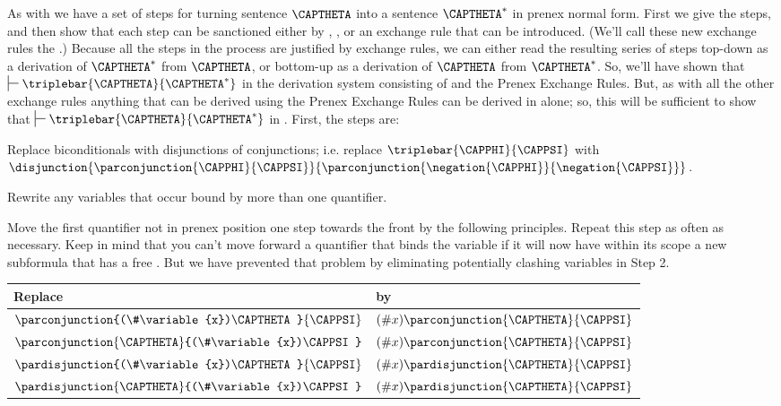 \begin{PROOF}
As with  we have a set of steps for turning sentence $\CAPTHETA$ into a sentence $\CAPTHETA^*$ in prenex normal form. 
First we give the steps, and then show that each step can be sanctioned either by , , or an exchange rule that can be introduced.
(We'll call these new exchange rules the .) 
Because all the steps in the process are justified by exchange rules, we can either read the resulting series of steps top-down as a derivation of $\CAPTHETA^*$ from $\CAPTHETA$, or bottom-up as a derivation of $\CAPTHETA$ from $\CAPTHETA^*$. 
So, we'll have shown that $\sststile{}{}\triplebar{\CAPTHETA}{\CAPTHETA^*}$ in the derivation system consisting of  and the Prenex Exchange Rules.
But, as with all the other exchange rules anything that can be derived using the Prenex Exchange Rules can be derived in \GQD{} alone;
so, this will be sufficient to show that $\sststile{}{}\triplebar{\CAPTHETA}{\CAPTHETA^*}$ in \GQD{}. First, the steps are:
\begin{cenumerate}
\item Replace biconditionals with disjunctions of conjunctions; i.e. replace $\triplebar{\CAPPHI}{\CAPPSI}$ with $\disjunction{\parconjunction{\CAPPHI}{\CAPPSI}}{\parconjunction{\negation{\CAPPHI}}{\negation{\CAPPSI}}}$.
\item Rewrite any variables that occur bound by more than one quantifier.
\item Move the first quantifier not in prenex position one step towards the front by the following principles. Repeat this step as often as necessary.  Keep in mind that you can't move forward a quantifier that binds the variable  if it will now have within its scope a new subformula that has a free .  But we have prevented that problem by eliminating potentially clashing variables in Step 2.
\begin{longtable}[c]{ l l }
\toprule
\textbf{Replace} & \textbf{by} \\
\midrule
$\parconjunction{(\#\variable{x})\CAPTHETA}{\CAPPSI}$ & $(\#\variable{x})\parconjunction{\CAPTHETA}{\CAPPSI}$ \\
$\parconjunction{\CAPTHETA}{(\#\variable{x})\CAPPSI}$ & $(\#\variable{x})\parconjunction{\CAPTHETA}{\CAPPSI}$ \\

$\pardisjunction{(\#\variable{x})\CAPTHETA}{\CAPPSI}$ & $(\#\variable{x})\pardisjunction{\CAPTHETA}{\CAPPSI}$ \\
$\pardisjunction{\CAPTHETA}{(\#\variable{x})\CAPPSI}$ & $(\#\variable{x})\pardisjunction{\CAPTHETA}{\CAPPSI}$ \\


\end{longtable}
\end{cenumerate}
\end{PROOF}
